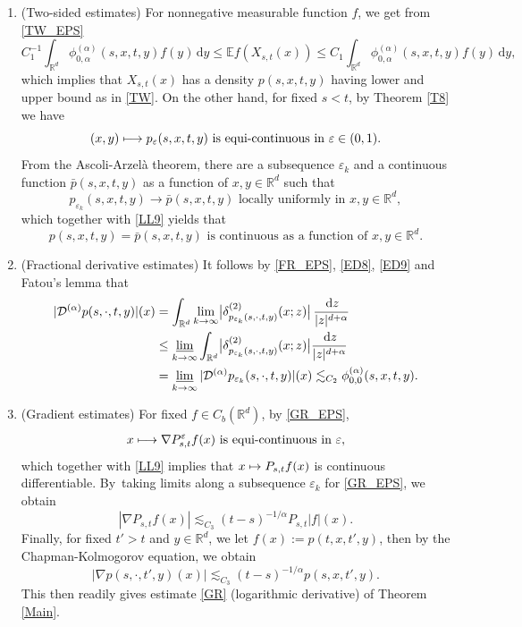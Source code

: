 \documentclass[11pt]{article}
\numberwithin{equation}{section}\providecommand{\asymp}{\mathrel{\sim}}
\def\mto{\mathchoice{\longmapsto}{\mapsto}{\mapsto}{\mapsto}}
\theoremstyle{plain}
\theoremstyle{definition}
\let\eps\varepsilon
\newcommand\cD{{\mathcal D}}
\newcommand\mE{\mathbb{E}}
\newcommand\mR{\mathbb{R}}
\newcommand\1{{\mathbf{1}}}
\newcommand{\dif}{\,\mathrm{d}}
\begin{document}
\begin{enumerate}
\item
(Two-sided estimates) For nonnegative measurable function $f$, we get from \eqref{TW_EPS}
\begin{equation*}
C^{-1}_1\int_{\mR^d}\phi^{(\alpha)}_{0,\alpha}(s,x,t,y)f(y)\dif y\leq \mE f(X_{s,t}(x))\leq C_1\int_{\mR^d}\phi^{(\alpha)}_{0,\alpha}(s,x,t,y) f(y)\dif y,
\end{equation*}
which implies that $X_{s,t}(x)$ has a density $p(s,x,t,y)$ having lower and upper bound as in \eqref{TW}.
On the other hand, for fixed $s<t$, by Theorem \ref{T8} we have
\[
(x,y)\mto p_\eps(s,x,t,y) \text{ is equi-continuous in $\eps\in(0,1)$}.
\]
From the Ascoli-Arzelà theorem, there are a subsequence $\eps_k$ and a continuous function $\bar p(s,x,t,y)$ as a function of $x,y\in\mR^d$ such that
\begin{equation}\label{ED8}
p_{\eps_k}(s,x,t,y)\to \bar p(s,x,t,y) \text{ locally uniformly in $x,y\in\mR^d$},
\end{equation}
which together with \eqref{LL9} yields that
\begin{equation}\label{ED9}
p(s,x,t,y)=\bar p(s,x,t,y)\text{ is continuous as a function of $x,y\in\mR^d$.}
\end{equation}

\item
(Fractional derivative estimates)
It follows by \eqref{FR_EPS}, \eqref{ED8}, \eqref{ED9} and Fatou's lemma that
\begin{align*}
|\cD^{(\alpha)}{p(s,\cdot,t,y)}|(x)&=\int_{\mR^d}\lim_{k\to\infty}\bigl|\delta^{(2)}_{p_{\eps_k}(s,\cdot,t,y)}(x;z)\bigr|\,\frac{\dif z}{|z|^{d+\alpha}}\\
&\leq\varliminf_{k\to\infty}\int_{\mR^d}\bigl|\delta^{(2)}_{p_{\eps_k}(s,\cdot,t,y)}(x;z)\bigr|\frac{\dif z}{|z|^{d+\alpha}}\\
&=\varliminf_{k\to\infty}|\cD^{(\alpha)}{p_{\eps_k}(s,\cdot,t,y)}|(x)\lesssim_{C_2}\phi^{(\alpha)}_{0,0}(s,x,t,y).
\end{align*}

\item
(Gradient estimates) For fixed $f\in C_b(\mR^d)$, by \eqref{GR_EPS},
\[
x\mto\nabla P^\eps_{s,t}f(x) \text{ is equi-continuous in $\eps$},
\]
which together with \eqref{LL9} implies that $x\mto P_{s,t}f(x)$ is continuous differentiable.
By~taking limits along a subsequence $\eps_k$ for \eqref{GR_EPS}, we obtain
\[
|\nabla P_{s,t}f(x)|\lesssim_{C_3} (t-s)^{-1/\alpha}P_{s,t}|f|(x).
\]
Finally, for fixed $t'>t$ and $y\in\mR^d$, we let $f(x):=p(t,x,t',y)$, then by the Chapman-Kolmogorov equation, we obtain
\[
|\nabla p(s,\cdot,t',y)(x)|\lesssim_{C_3} (t-s)^{-1/\alpha}p(s,x,t',y).
\]
This then readily gives estimate \eqref{GR} (logarithmic derivative) of Theorem \ref{Main}.
\end{enumerate}
\end{document}
